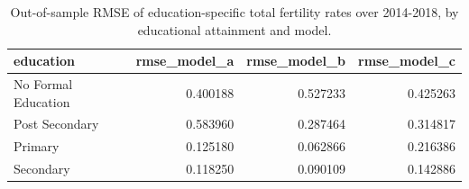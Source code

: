 \begin{table}[ht]
\centering
\begin{tabular}{lrrr}
\hline
education & rmse_model_a & rmse_model_b & rmse_model_c \\
\hline
No Formal Education & 0.400188 & 0.527233 & 0.425263 \\
Post Secondary & 0.583960 & 0.287464 & 0.314817 \\
Primary & 0.125180 & 0.062866 & 0.216386 \\
Secondary & 0.118250 & 0.090109 & 0.142886 \\
\hline
\end{tabular}
\caption{Out-of-sample RMSE of education-specific total fertility rates over 2014-2018, by educational attainment and model.}
\label{tab:new_table_e9}
\end{table}
